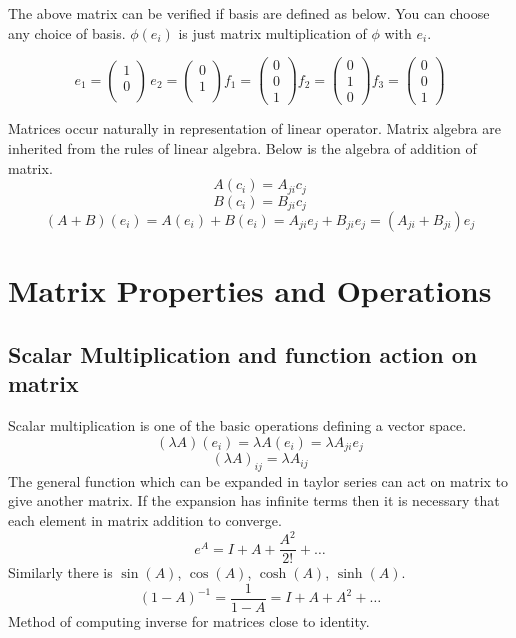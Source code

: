 \documentclass[12pt, a4paper]{report}
\begin{document}
The above matrix can be verified if basis are defined as below. You can choose any choice of basis. $\phi(e_i)$ is just matrix multiplication of $\phi$ with $e_i$.

$$
e_1 = 
\begin{pmatrix}
1\\
0\\
\end{pmatrix}\,
e_2 =
\begin{pmatrix}
0\\
1\\
\end{pmatrix}
f_1 = 
\begin{pmatrix}
0\\
0\\
1
\end{pmatrix}
f_2 = 
\begin{pmatrix}
0\\
1\\
0
\end{pmatrix}
f_3 = 
\begin{pmatrix}
0\\
0\\
1
\end{pmatrix}
$$

Matrices occur naturally in representation of linear operator. Matrix algebra are inherited from the rules of linear algebra. Below is the algebra of addition of matrix.
$$
A(c_i) =  A_{ji} c_j
$$
$$
B(c_i) = B_{ji} c_j
$$
$$
(A+B)(e_i) = A(e_i)+B(e_i) = A_{ji}e_j + B_{ji}e_j = (A_{ji}+B_{ji})e_j
$$

\section{Matrix Properties and Operations}

\subsection{Scalar Multiplication and function action on matrix}
Scalar multiplication is one of the basic operations defining a vector space.
$$
(\lambda A)(e_i) = \lambda A(e_i) = \lambda A_{ji} e_j
$$
$$
(\lambda A)_{ij} = \lambda A_{ij}
$$
The general function which can be expanded in taylor series can act on matrix to give another matrix.
If the expansion has infinite terms then it is necessary that each element in matrix addition to converge.
$$
e^A = I + A + \frac{A^2}{2!} + \dots
$$
Similarly there is $\sin(A)$, $\cos(A)$, $\cosh(A)$, $\sinh(A)$.
$$
(1-A)^{-1} = \frac{1}{1-A} = I + A + A^2 + \dots
$$
Method of computing inverse for matrices close to identity.
\end{document}
